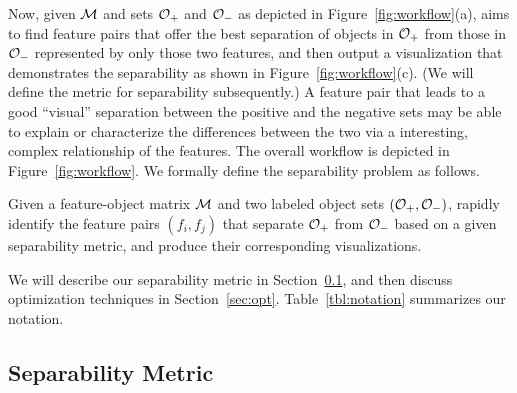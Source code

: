 Now, given ${\mathcal{M}}$ and sets 
${\mathcal{O}}_+$ and ${\mathcal{O}}_-$ as depicted in Figure~\ref{fig:workflow}(a), 
\genviz aims to find feature pairs that 
offer the best separation of objects 
in ${\mathcal{O}}_+$ from those in ${\mathcal{O}}_-$ represented by only those two features, 
and then output a visualization that demonstrates the separability 
as shown in Figure~\ref{fig:workflow}(c). 
(We will define the metric for separability subsequently.) 
A feature pair that leads to a good ``visual'' separation 
between the positive and the negative sets may be able 
to explain or characterize the differences 
between the two via a interesting, 
complex relationship of the features. 
The overall workflow is depicted in Figure~\ref{fig:workflow}.
We formally define the separability problem as follows.
\begin{formulation}[Separability]\label{prob:separability}
Given a feature-object matrix ${\mathcal{M}}$ and two labeled object sets $({\mathcal{O}}_+,{\mathcal{O}}_-)$, rapidly identify the \topk feature pairs $(f_i,f_j)$ that separate ${\mathcal{O}}_+$ from ${\mathcal{O}}_-$ based on a given separability metric, and produce their corresponding {visualizations}.
\end{formulation}
\noindent %
We will describe our separability metric in Section~\ref{sec:metric}, and then discuss optimization techniques in Section~\ref{sec:opt}. Table~\ref{tbl:notation} summarizes our notation.



\subsection{Separability Metric}\label{sec:metric}

